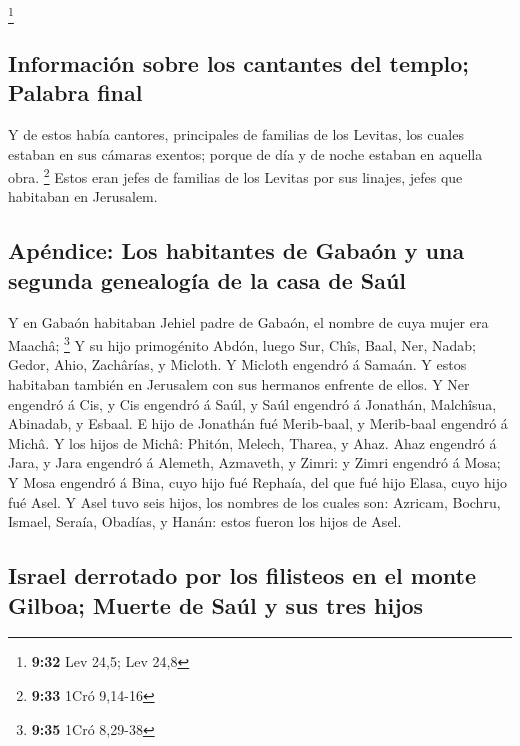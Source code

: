 \footnote{\textbf{9:32} Lev 24,5; Lev 24,8}

\hypertarget{informaciuxf3n-sobre-los-cantantes-del-templo-palabra-final}{%
\subsection{Información sobre los cantantes del templo; Palabra
final}\label{informaciuxf3n-sobre-los-cantantes-del-templo-palabra-final}}

 Y de estos había cantores, principales de familias de los
Levitas, los cuales estaban en sus cámaras exentos; porque de día y de
noche estaban en aquella obra. \footnote{\textbf{9:33} 1Cró 9,14-16}
 Estos eran jefes de familias de los Levitas por sus
linajes, jefes que habitaban en Jerusalem.

\hypertarget{apuxe9ndice-los-habitantes-de-gabauxf3n-y-una-segunda-genealoguxeda-de-la-casa-de-sauxfal}{%
\subsection{Apéndice: Los habitantes de Gabaón y una segunda genealogía
de la casa de
Saúl}\label{apuxe9ndice-los-habitantes-de-gabauxf3n-y-una-segunda-genealoguxeda-de-la-casa-de-sauxfal}}

 Y en Gabaón habitaban Jehiel padre de Gabaón, el nombre de
cuya mujer era Maachâ; \footnote{\textbf{9:35} 1Cró 8,29-38}
 Y su hijo primogénito Abdón, luego Sur, Chîs, Baal, Ner,
Nadab;  Gedor, Ahio, Zachârías, y Micloth.  Y
Micloth engendró á Samaán. Y estos habitaban también en Jerusalem con
sus hermanos enfrente de ellos.  Y Ner engendró á Cis, y
Cis engendró á Saúl, y Saúl engendró á Jonathán, Malchîsua, Abinadab, y
Esbaal.  E hijo de Jonathán fué Merib-baal, y Merib-baal
engendró á Michâ.  Y los hijos de Michâ: Phitón, Melech,
Tharea, y Ahaz.  Ahaz engendró á Jara, y Jara engendró á
Alemeth, Azmaveth, y Zimri: y Zimri engendró á Mosa;  Y
Mosa engendró á Bina, cuyo hijo fué Rephaía, del que fué hijo Elasa,
cuyo hijo fué Asel.  Y Asel tuvo seis hijos, los nombres de
los cuales son: Azricam, Bochru, Ismael, Seraía, Obadías, y Hanán: estos
fueron los hijos de Asel.

\hypertarget{israel-derrotado-por-los-filisteos-en-el-monte-gilboa-muerte-de-sauxfal-y-sus-tres-hijos}{%
\subsection{Israel derrotado por los filisteos en el monte Gilboa;
Muerte de Saúl y sus tres
hijos}\label{israel-derrotado-por-los-filisteos-en-el-monte-gilboa-muerte-de-sauxfal-y-sus-tres-hijos}}

